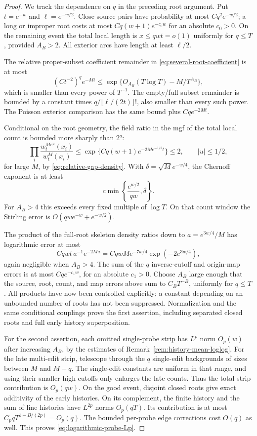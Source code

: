 \documentclass[11pt,letterpaper]{article}
\begin{document}
\begin{proof}
We track the dependence on $q$ in the preceding root argument.
Put $t=e^{-w}$ and $\ell=e^{-w/2}$. Close source pairs have
probability at most $Cq^2e^{-w/2}$; a long or improper root costs
at most $Cq(w+1)e^{-c_0w}$ for an absolute $c_0>0$.
On the remaining event the total local length is
$x\le qwt=o(1)$ uniformly for $q\le T$, provided $A_B>2$.
All exterior arcs have length at least $\ell/2$.

The relative proper-subset coefficient remainder in
\eqref{eq:several-root-coefficient} is at most
\[
 (Ct^{-2})^q e^{-Mt}
       \le\exp\{O_{A_B}(T\log T)-M/T^{A_B}\},
\]
which is smaller than every power of $T^{-1}$. The empty/full
subset remainder is bounded by a constant times
$q/\lfloor\ell/(2t)\rfloor!$, also smaller than every such power.
The Poisson exterior comparison has the same bound plus
$Cqe^{-2Mt}$.

Conditional on the root geometry, the field ratio in the mgf
of the total local count is bounded more sharply than $2^q$:
\[
 \prod_i\frac{w_t^{Me^u}(x_i)}{w_t^M(x_i)}
 \le\exp\{Cq(w+1)e^{-2Me^{-1/2}t}\}\le2,
                                      \qquad |u|\le1/2,
\]
for large $M$, by \eqref{eq:relative-gap-density}.
With $\delta=\sqrt M e^{-w/4}$, the Chernoff exponent is at least
\[
 c\min\left\{\frac{e^{w/2}}{q w},\delta\right\}.
\]
For $A_B>4$ this exceeds every fixed multiple of $\log T$.
On that count window the Stirling error is
$O(qw e^{-w}+e^{-w/2})$.

The product of the full-root skeleton density ratios down to
$a=e^{3w/4}/M$ has logarithmic error at most
\[
 Cqwt\,a^{-1}e^{-2Ma}
  =CqwM e^{-7w/4}\exp(-2e^{3w/4}),
\]
again negligible when $A_B>4$. The sum of the $q$ inverse-cutoff
and origin-map errors is at most $Cqe^{-c_1w}$, for an absolute
$c_1>0$. Choose $A_B$ large enough that the source, root, count,
and map errors above sum to $C_BT^{-B}$, uniformly for $q\le T$.
All products have now been controlled explicitly; a constant
depending on an unbounded number of roots has not been suppressed.
Normalization and the same conditional couplings prove the
first assertion, including separated closed roots and full early
history superposition.

For the second assertion, each omitted single-probe strip has
$L^p$ norm $O_p(w)$ after increasing $A_B$, by the estimates of
Remark~\ref{rem:history-mean-loglog}. For the late multi-edit
strip, telescope through the $q$ single-edit backgrounds of sizes
between $M$ and $M+q$. The single-edit constants are uniform in
that range, and using their smaller high cutoffs only enlarges
the late counts. Thus the total strip contribution is $O_p(qw)$.
On the good event, disjoint closed roots give exact additivity
of the early histories. On its complement, the finite history
and the sum of line histories have $L^{2p}$ norms $O_p(qT)$.
Its contribution is at most $C_pqT^{1-B/(2p)}=O_p(q)$.
The bounded per-probe edge corrections cost $O(q)$ as well.
This proves \eqref{eq:logarithmic-probe-Lp}.
\end{proof}
\end{document}
